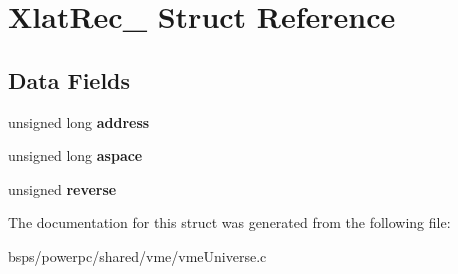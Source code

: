 \hypertarget{structXlatRec__}{}\section{Xlat\+Rec\+\_\+ Struct Reference}
\label{structXlatRec__}
\subsection*{Data Fields}
\begin{DoxyCompactItemize}
\item 
\mbox{\label{structXlatRec___a58f377fecccf296e3b404c56bf9c1fa5}} 
unsigned long {\bfseries address}
\item 
\mbox{\label{structXlatRec___aededfbc6d18a2182b49371721a201b5f}} 
unsigned long {\bfseries aspace}
\item 
\mbox{\label{structXlatRec___ab6696842e562ecc7b7e8cf72b37ff14e}} 
unsigned {\bfseries reverse}
\end{DoxyCompactItemize}


The documentation for this struct was generated from the following file\+:\begin{DoxyCompactItemize}
\item 
bsps/powerpc/shared/vme/vme\+Universe.\+c\end{DoxyCompactItemize}
